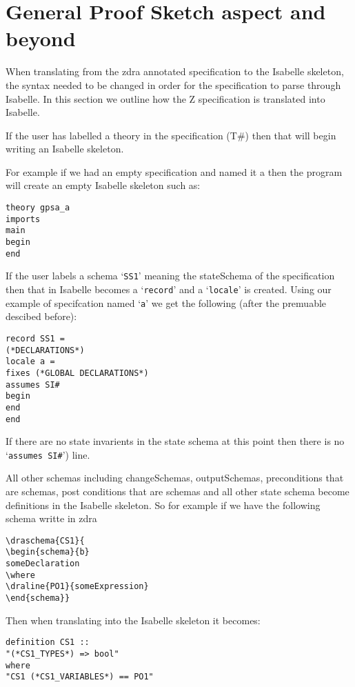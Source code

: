 \chapter{General Proof Sketch aspect and beyond}
\label{chap:gpsa2isa}

When translating from the \gls{zdra} annotated specification to the Isabelle skeleton, the syntax needed to be changed in order for the specification to parse through Isabelle. In this section we outline how the Z specification is translated into Isabelle.

If the user has labelled a theory in the specification (T\#) then that will begin writing an Isabelle skeleton.

For example if we had an empty specification and named it a then the program will create an empty Isabelle skeleton such as:

\begin{verbatim}
theory gpsa_a
imports
main
begin
end
\end{verbatim}

If the user labels a schema `\texttt{SS1}' meaning the stateSchema of the specification then that in Isabelle becomes a `\texttt{record}' and a `\texttt{locale}' is created. Using our example of specifcation named `\texttt{a}' we get the following (after the premuable descibed before):
\begin{verbatim}
record SS1 =
(*DECLARATIONS*)
locale a =
fixes (*GLOBAL DECLARATIONS*)
assumes SI#
begin
end
end
\end{verbatim}

If there are no state invarients in the state schema at this point then there is no `\texttt{assumes SI\#}') line.

All other schemas including changeSchemas, outputSchemas, preconditions that are schemas, post conditions that are schemas and all other state schema become definitions in the Isabelle skeleton.
So for example if we have the following schema writte in \gls{zdra}
\begin{verbatim}
\draschema{CS1}{
\begin{schema}{b}
someDeclaration
\where
\draline{PO1}{someExpression}
\end{schema}}
\end{verbatim}

Then when translating into the Isabelle skeleton it becomes:
\begin{verbatim}
definition CS1 ::
"(*CS1_TYPES*) => bool"
where
"CS1 (*CS1_VARIABLES*) == PO1"
\end{verbatim}

